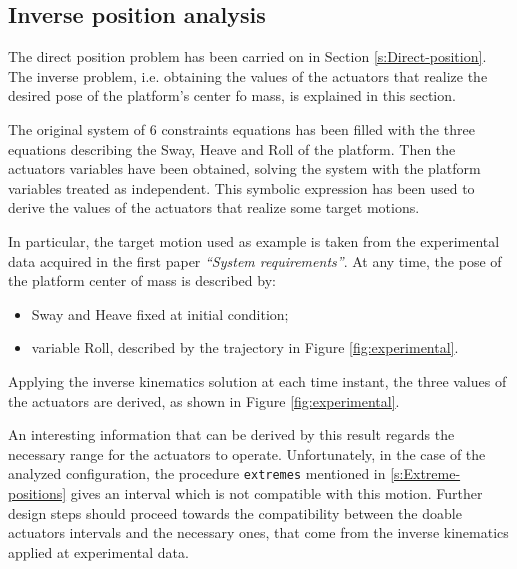 \documentclass[10.5pt, twocolumn]{article}
\newcommand{\Virgolette}[1]{``#1''}
\begin{document}
\subsection{Inverse position analysis}
\label{s:Inverse-position}
The direct position problem has been carried on in Section \ref{s:Direct-position}. The inverse problem, i.e. obtaining the values of the actuators that realize the desired pose of the platform's center fo mass, is explained in this section.

The original system of 6 constraints equations has been filled with the three equations describing the Sway, Heave and Roll of the platform. Then the actuators variables have been obtained, solving the system with the platform variables treated as independent.
This symbolic expression has been used to derive the values of the actuators that realize some target motions.

In particular, the target motion used as example is taken from the experimental data acquired in the first paper \textit{\Virgolette{System requirements}}. At any time, the pose of the platform center of mass is described by:
\begin{itemize}
  \item Sway and Heave fixed at initial condition;
  \item variable Roll, described by the trajectory in Figure \ref{fig:experimental}.
\end{itemize}

Applying the inverse kinematics solution at each time instant, the three values of the actuators are derived, as shown in Figure \ref{fig:experimental}.

An interesting information that can be derived by this result regards the necessary range for the actuators to operate. Unfortunately, in the case of the analyzed configuration, the procedure \texttt{extremes} mentioned in \ref{s:Extreme-positions} gives an interval which is not compatible with this motion. Further design steps should proceed towards the compatibility between the doable actuators intervals and the necessary ones, that come from the inverse kinematics applied at experimental data.
\end{document}
